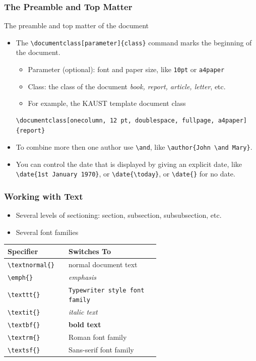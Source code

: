 \documentclass[aspectratio=169]{beamer}
\begin{document}
\begin{frame}[fragile]
\frametitle{The Preamble and Top Matter}
    The preamble and top matter of the document
    \begin{itemize}
        \item The \verb|\documentclass[parameter]{class}| command marks the beginning of the document. 
        \begin{itemize}
            \item Parameter (optional): font and paper size, like \texttt{10pt} or \texttt{a4paper}
            \item Class: the class of the document \textit{book, report, article, letter}, etc.  
            \item For example, the KAUST template document class
        \end{itemize}\small
        \begin{verbatim}
\documentclass[onecolumn, 12 pt, doublespace, fullpage, a4paper]{report}
        \end{verbatim}
        \item To combine more then one author use \verb|\and|, like \verb|\author{John \and Mary}|.
        \item You can control the date that is displayed by giving an explicit date, like \verb|\date{1st January 1970}|, or \verb|\date{\today}|, or \verb|\date{}| for no date.
    \end{itemize}
\end{frame}

\begin{frame}[fragile]
\frametitle{Working with Text}
    \begin{itemize}
        \item Several levels of sectioning: section, subsection, subsubsection, etc.
        \item Several font families
    \end{itemize}
    \medskip
    \small
    \begin{tabular}{l p{0.6\linewidth} }
         \textbf{Specifier} &  \textbf{Switches To}\\ \hline
         \verb|\textnormal{}|  & normal document text\\
         \verb|\emph{}| & \emph{emphasis}\\
         \verb|\texttt{}| & \texttt{Typewriter style font family}\\
         \verb|\textit{}| & \textit{italic text}\\
         \verb|\textbf{}| & \textbf{bold text}\\
         \verb|\textrm{}| & \textrm{Roman font family}\\
         \verb|\textsf{}| & \textsf{Sans-serif font family}\\         
    \end{tabular}
    \normalsize
\end{frame}
\end{document}
